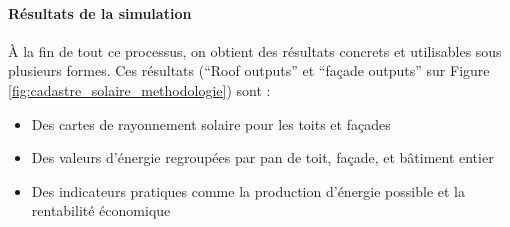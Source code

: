 {\paragraph{Résultats de la simulation}
\par{À la fin de tout ce processus, on obtient des résultats concrets et utilisables sous plusieurs formes. Ces résultats (``Roof outputs'' et ``façade outputs'' sur Figure \ref{fig:cadastre_solaire_methodologie}) sont :
\begin{itemize}
    \item Des cartes de rayonnement solaire pour les toits et façades
    \item Des valeurs d'énergie regroupées par pan de toit, façade, et bâtiment entier
    \item Des indicateurs pratiques comme la production d'énergie possible et la rentabilité économique
\end{itemize}}

}
